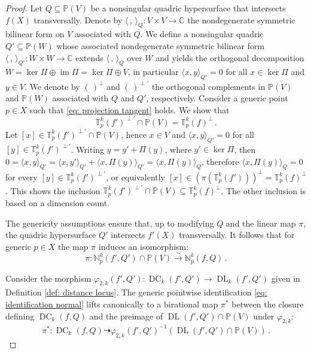 \documentclass[11pt,reqno]{amsart}
\numberwithin{equation}{section}
\theoremstyle{plain}
\numberwithin{theorem}{section}
\theoremstyle{definition}
\newcommand{\N}{\mathbb{N}}
\renewcommand{\P}{\mathbb{P}}
\newcommand{\C}{\mathbb{C}}
\newcommand{\T}{\mathbb{T}}
\newcommand{\DC}{\operatorname{DC}}
\newcommand{\DL}{\operatorname{DL}}
\newcommand{\image}{\operatorname{im}}
\begin{document}
\begin{proof}
Let $Q\subseteq\P(V)$ be a nonsingular quadric hypersurface that intersects $f(X)$ transversally. Denote by $\langle\,,\,\rangle_Q\colon V\times V\to\C$ the nondegenerate symmetric bilinear form on $V$ associated with $Q$. We define a nonsingular quadric $Q'\subseteq\P(W)$ whose associated nondegenerate symmetric bilinear form $\langle\,,\,\rangle_{Q'}\colon W\times W\to\C$ extends $\langle\,,\,\rangle_Q$ over $W$ and yields the orthogonal decomposition $W=\ker\Pi\oplus\image\Pi=\ker\Pi\oplus V$, in particular $\langle x,y\rangle_{Q'}=0$ for all $x\in\ker\Pi$ and $y\in V$. We denote by $(\,)^\perp$ and $(\,)^{\perp'}$ the orthogonal complements in $\P(V)$ and $\P(W)$ associated with $Q$ and $Q'$, respectively. Consider a generic point $p\in X$ such that \eqref{eq: projection tangent} holds. We show that
\begin{equation}\label{eq: intersection of normal spaces}
\T^k_p(f')^{\perp'} \cap \P(V) = \T^k_p(f)^{\perp}\,.
\end{equation}
Let $[x]\in \T^k_p(f')^{\perp'} \cap \P(V)$, hence $x\in V$ and $\langle x,y\rangle_{Q'}=0$ for all $[y]\in \T^k_p(f')^{\perp'}$. Writing $y=y'+\Pi(y)$, where $y'\in\ker\Pi$, then
$0 = \langle x,y\rangle_{Q'} = \langle x,y'\rangle_{Q'} + \langle x,\Pi(y)\rangle_{Q'} = \langle x,\Pi(y)\rangle_Q$,
therefore $\langle x,\Pi(y)\rangle_Q=0$ for every $[y]\in \T^k_p(f')^{\perp'}$, or equivalently $[x]\in (\pi(\T_p^k(f')))^\perp=\T_p^k(f)^\perp$. This shows the inclusion $\T^k_p(f')^{\perp'} \cap \P(V) \subseteq \T^k_p(f)^{\perp}$. The other inclusion is based on a dimension count.

The genericity assumptions ensure that, up to modifying $Q$ and the linear map $\pi$, the quadric hypersurface $Q'$ intersects $f'(X)$ transversally. It follows that for generic $p\in X$ the map $\pi$ induces an isomorphism:
\begin{equation}\label{eq: identification normal}
\pi\colon \N_p^k(f',Q') \cap \P(V)\xrightarrow{\sim}\N_p^k(f,Q)\,.    
\end{equation}

Consider the morphism $\varphi_{2,k}(f',Q')\colon\DC_k(f',Q')\to\DL_k(f',Q')$ given in Definition \ref{def: distance locus}.
The generic pointwise identification \eqref{eq: identification normal} lifts canonically to a birational map $\pi^*$ between the closure defining $\DC_k(f,Q)$ and the preimage of $\DL(f',Q')\cap \P(V)$ under $\varphi_{2,k}$:
\[
\pi^*\colon \DC_k(f,Q)\dashrightarrow\varphi_{2,k}(f',Q')^{-1}(\DL(f',Q')\cap \P(V))\,.
\]
 

\end{proof}
\end{document}
